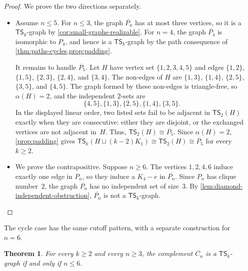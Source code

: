 \documentclass[a4paper]{article}
\theoremstyle{plain}
\newtheorem{theorem}{Theorem}[section]
\theoremstyle{definition}
\newcommand{\TSsym}{\mathsf{TS}}
\numberwithin{equation}{section}
\begin{document}
\begin{proof}
We prove the two directions separately.
\begin{itemize}
\item[$(\Leftarrow)$]
Assume $n\le 5$.
For $n\le 3$, the graph $\overline{P_n}$ has at most three vertices, so it is a $\TSsym_k$-graph by \cref{cor:small-graphs-realizable}.
For $n=4$, the graph $\overline{P_4}$ is isomorphic to $P_4$, and hence is a $\TSsym_k$-graph by the path consequence of \cref{thm:paths-cycles,prop:padding}.

It remains to handle $\overline{P_5}$.
Let $H$ have vertex set $\{1,2,3,4,5\}$ and edges $\{1,2\}$, $\{1,5\}$, $\{2,3\}$, $\{2,4\}$, and $\{3,4\}$.
The non-edges of $H$ are $\{1,3\}$, $\{1,4\}$, $\{2,5\}$, $\{3,5\}$, and $\{4,5\}$.
The graph formed by these non-edges is triangle-free, so $\alpha(H)=2$, and the independent $2$-sets are
\[
\{4,5\},\{1,3\},\{2,5\},\{1,4\},\{3,5\}.
\]
In the displayed linear order, two listed sets fail to be adjacent in $\TSsym_2(H)$ exactly when they are consecutive: either they are disjoint, or the exchanged vertices are not adjacent in~$H$.
Thus, $\TSsym_2(H)\cong\overline{P_5}$.
Since $\alpha(H)=2$, \cref{prop:padding} gives $\TSsym_k(H\sqcup (k-2)K_1)\cong\TSsym_2(H)\cong\overline{P_5}$ for every $k\ge 2$.

\item[$(\Rightarrow)$]
We prove the contrapositive.
Suppose $n\ge 6$.
The vertices $1,2,4,6$ induce exactly one edge in $P_n$, so they induce a $K_4-e$ in $\overline{P_n}$.
Since $P_n$ has clique number~$2$, the graph $\overline{P_n}$ has no independent set of size~$3$.
By \cref{lem:diamond-independent-obstruction}, $\overline{P_n}$ is not a $\TSsym_k$-graph.
\end{itemize}
\end{proof}

The cycle case has the same cutoff pattern, with a separate construction for $n=6$.

\begin{theorem}
\label{thm:complement-cycles}
For every $k\ge 2$ and every $n\ge 3$, the complement $\overline{C_n}$ is a $\TSsym_k$-graph if and only if $n\le 6$.
\end{theorem}
\end{document}
